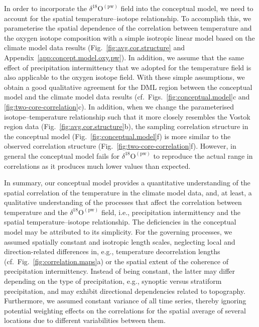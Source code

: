 \documentclass[cp, manuscript]{copernicus}
\begin{document}
In order to incorporate the $\delta^{18}\mathrm{O}^{\mathrm{(pw)}}$ field into
the conceptual model, we need to account for the spatial temperature--isotope
relationship. To accomplish this, we parameterise the spatial dependence of the
correlation between temperature and the oxygen isotope composition with a simple
isotropic linear model based on the climate model data results
(Fig.~\ref{fig:avg.cor.structure} and
Appendix~\ref{app:concept.model.oxy.pw}). In addition, we assume that the same
effect of precipitation intermittency that we adopted for the temperature field
is also applicable to the oxygen isotope field. With these simple assumptions,
we obtain a good qualitative agreement for the DML region between the conceptual
model and the climate model data results (cf.\
Figs.~\ref{fig:conceptual.model}c and \ref{fig:two-core-correlation}c). In
addition, when we change the parameterised isotope--temperature relationship
such that it more closely resembles the Vostok region data
(Fig.~\ref{fig:avg.cor.structure}b), the sampling correlation structure in the
conceptual model (Fig.~\ref{fig:conceptual.model}f) is more similar to the
observed correlation structure (Fig.~\ref{fig:two-core-correlation}f). However,
in general the conceptual model fails for
$\delta^{18}\mathrm{O}^{\mathrm{(pw)}}$ to reproduce the actual range in
correlations as it produces much lower values than expected.

In summary, our conceptual model provides a quantitative understanding of the
spatial correlation of the temperature in the climate model data, and, at least,
a qualitative understanding of the processes that affect the correlation between
temperature and the $\delta^{18}\mathrm{O}^{\mathrm{(pw)}}$ field, i.e.,
precipitation intermittency and the spatial temperature--isotope
relationship. The deficiencies in the conceptual model may be attributed to its
simplicity. For the governing processes, we assumed spatially constant and
isotropic length scales, neglecting local and direction-related differences in,
e.g., temperature decorrelation lengths
(cf.~Fig.~\ref{fig:correlation.maps}a) or the spatial extent of the
coherence of precipitation intermittency. Instead of being constant, the latter
may differ depending on the type of precipitation, e.g., synoptic versus
stratiform precipitation, and may exhibit directional dependencies related to
topography. Furthermore, we assumed constant variance of all time series,
thereby ignoring potential weighting effects on the correlations for the spatial
average of several locations due to different variabilities between them.
\end{document}
